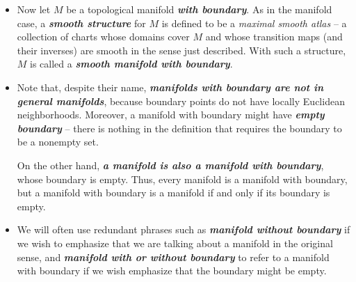 \documentclass[11pt]{article}
\begin{document}
\begin{itemize}
\item \begin{definition}
Now let $M$ be a topological manifold \textbf{\emph{with boundary}}. As in the manifold case, a \emph{\textbf{smooth structure}} for $M$ is defined to be a \emph{maximal smooth atlas} -- a collection of charts whose domains cover $M$ and whose transition maps (and their inverses) are smooth in the sense just described. With such a structure, $M$ is called a \emph{\textbf{smooth manifold with boundary}}. 
\end{definition}

\item \begin{remark}
Note that, despite their name, \emph{\textbf{manifolds with boundary are not in general manifolds}}, because boundary points do not have locally Euclidean neighborhoods. Moreover, a manifold with boundary might have \emph{\textbf{empty boundary}} -- there is nothing in the definition that requires the boundary to be a nonempty set. 

On the other hand, \emph{\textbf{a manifold is also a manifold with boundary}}, whose boundary is empty. Thus, every manifold is a manifold with boundary, but a manifold with boundary is a manifold if and only if its boundary is empty.
\end{remark}

\item  \begin{remark}
We will often use redundant phrases such as \emph{\textbf{manifold without boundary}} if we wish to emphasize that we are talking about a manifold in the original sense, and \emph{\textbf{manifold with or without boundary}} to refer to a manifold with boundary if we wish emphasize that the boundary might be empty.
\end{remark}
\end{itemize}
\end{document}
